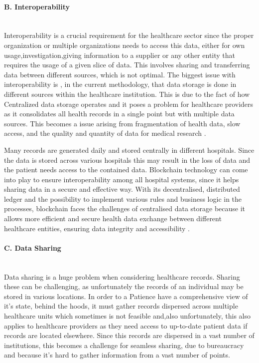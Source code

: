 \paragraph{B. Interoperability} \mbox{}\\
Interoperability is a crucial requirement for the healthcare sector since the proper organization or multiple organizations 
needs to access this data, either for own usage,investigation,giving information to a supplier or any other entity that requires 
the usage of a given slice of data. This involves sharing and transferring data between different sources, which is not optimal. The 
biggest issue with interoperability is , in the current methodology, that data storage is done in different sources within the healthcare 
institution. This is due to the fact of how Centralized data storage operates and it poses a problem for healthcare providers as it 
consolidates all health records in a single point but with multiple data sources. This becomes a issue arising from fragmentation of 
health data, slow access, and the quality and quantity of data for medical research \cite{blockchain-interop}.

Many records are generated daily and stored centrally in different hospitals. Since the data is stored across various hospitals 
this may result in the loss of data and the patient needs access to the contained data. Blockchain technology can come into play to 
ensure interoperability among all hospital systems, since it helps sharing data in a secure and effective way. With its decentralised,
distributed ledger and the possibility to implement various rules and business logic in the processes, blockchain faces the challenges of 
centralised data storage because it allows more efficient and secure health data exchange between 
different healthcare entities, ensuring data integrity and accessibility \cite{med-rec}. 

\paragraph{C. Data Sharing} \mbox{}\\
Data sharing is a huge problem when considering healthcare records. Sharing these can be challenging, as unfortunately the 
records of an individual may be stored in various locations. In order to a Patience have a comprehensive view of it's state, 
behind the hoods, it must gather records dispersed across multiple healthcare units which sometimes is not feasible and,also 
unfortunately, this also applies to healthcare providers as they need access to up-to-date patient data if records are located 
elsewhere. Since this records are dispersed in a vast number of institutions, this becomes a challenge for seamless sharing, due 
to bureaucracy and because it's hard to gather information from a vast number of points. 

